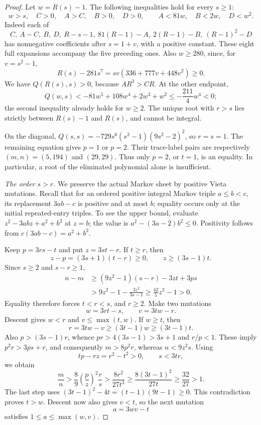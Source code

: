\begin{proof}
Let $w=R(s)-1$. The following inequalities hold for every $s\geqslant1$:
\begin{equation}
 w>s,\quad C>0,\quad A>C,\quad B>0,\quad D>0,
 \qquad A<81w,\quad B<2w,\quad D<w^2.
 \label{eq:i19-endpoint-margins}
\end{equation}
Indeed each of
$$
 C,\ A-C,\ B,\ D,\ R-s-1,\ 81(R-1)-A,\
 2(R-1)-B,\ (R-1)^2-D
$$
has nonnegative coefficients after $s=1+v$, with a positive constant. These eight full expansions accompany the five preceding ones. Also $w\geqslant280$, since, for $v=s^2-1$,
$$
 R(s)-281s^7=sv(336+777v+448v^2)\geqslant0.
$$
We have $Q(R(s),s)>0$, because $AR^3>CR$. At the other endpoint,
$$
 Q(w,s)<-81w^5+108w^4+2w^3+w^2
 \leqslant-\frac{211}{4}w^4<0;
$$
the second inequality already holds for $w\geqslant2$. The unique root with $r>s$ lies strictly between $R(s)-1$ and $R(s)$, and cannot be integral.

On the diagonal, $Q(s,s)=-729s^6(s^2-1)(9s^2-2)^2$, so $r=s=1$. The remaining equation gives $p=1$ or $p=2$. Their trace-label pairs are respectively $(m,n)=(5,194)$ and $(29,29)$. Thus only $p=2$, or $t=1$, is an equality. In particular, a root of the eliminated polynomial alone is insufficient.

\smallskip\noindent\emph{The order $s>r$.}
We preserve the actual Markov sheet by positive Vieta mutations. Recall that for an ordered positive integral Markov triple $a\leqslant b<c$, its replacement $3ab-c$ is positive and at most $b$; equality occurs only at the initial repeated-entry triples. To see the upper bound, evaluate $z^2-3abz+a^2+b^2$ at $z=b$; the value is $a^2-(3a-2)b^2\leqslant0$. Positivity follows from $c(3ab-c)=a^2+b^2$.

Keep $p=3rs-t$ and put $z=3st-r$. If $t\geqslant r$, then
$$
 z-p=(3s+1)(t-r)\geqslant0,\qquad z\geqslant(3s-1)t.
$$
Since $s\geqslant2$ and $s-r\geqslant1$,
\begin{align*}
 n-m&\geqslant(9z^2-1)(s-r)-3zt+3ps\\
 &>9z^2-1-\frac{3z^2}{3s-1}
 \geqslant\frac{42}{5}z^2-1>0.
\end{align*}
Equality therefore forces $t<r<s$, and $r\geqslant2$. Make two mutations
$$
 w=3rt-s,\qquad v=3tw-r.
$$
Descent gives $w<r$ and $v\leqslant\max(t,w)$. If $w\geqslant t$, then
$$
 r=3tw-v\geqslant(3t-1)w\geqslant(3t-1)t.
$$
Also $p>(3s-1)r$, whence $pr>4(3s-1)>3s+1$ and $r/p<1$. These imply $p^2r>3ps+r$, and consequently $m>8p^2r$, whereas $n<9z^2s$. Using
$$
 tp-rz=r^2-t^2>0,\qquad s<3tr,
$$
we obtain
$$
 \frac mn>\frac89\left(\frac pz\right)^2\frac rs
 >\frac{8r^2}{27t^3}
 \geqslant\frac{8(3t-1)^2}{27t}
 \geqslant\frac{32}{27}>1.
$$
The last step uses $(3t-1)^2-4t=(t-1)(9t-1)\geqslant0$. This contradiction proves $t>w$. Descent now also gives $v<t$, so the next mutation
$$
 a=3wv-t
$$
satisfies $1\leqslant a\leqslant\max(w,v)$.


\end{proof}
